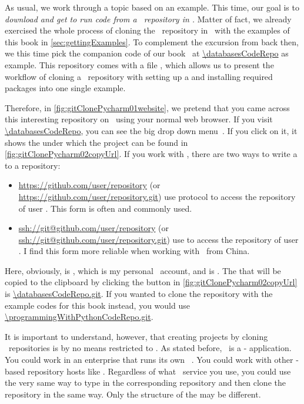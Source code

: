As usual, we work through a topic based on an example.
This time, our goal is to \emph{download and get to run code from a \github\ repository in \pycharm.}
Matter of fact, we already exercised the whole process of cloning the \github\ repository in \pycharm\ with the examples of this book in \cref{sec:gettingExamples}.
To complement the excursion from back then, we this time pick the companion code of our  book~\cite{databases} at \url{\databasesCodeRepo} as example.
This repository comes with a file , which allows us to present the workflow of cloning a \git\ repository with setting up a  and installing required packages into one single example.

Therefore, in \cref{fig:gitClonePycharm01website}, we pretend that you came across this interesting repository on \github\ using your normal web browser.
If you visit \url{\databasesCodeRepo}, you can see the big drop down menu~.
If you click on it, it shows the   under which the project can be found in \cref{fig:gitClonePycharm02copyUrl}.
If you work with \github, there are two ways to write a  to a repository:%
%
\begin{itemize}%
%
\item \url{https://github.com/user/repository} (or \url{https://github.com/user/repository.git}) use  protocol to access the repository  of user . %
This form is often and commonly used.%
%
\item \url{ssh://git@github.com/user/repository} (or \url{ssh://git@github.com/user/repository.git}) use  to access the repository  of user . %
I find this form more reliable when working with \github\ from China.%
%
\end{itemize}%
%
Here, obviously,  is , which is my personal \github\ account, and  is .
The  that will be copied to the clipboard by clicking the button in \cref{fig:gitClonePycharm02copyUrl} is \url{\databasesCodeRepo.git}.
If you wanted to clone the repository with the example codes for this book instead, you would use \url{\programmingWithPythonCodeRepo.git}.

It is important to understand, however, that creating projects by cloning \git\ repositories is by no means restricted to \github.
As stated before, \git\ is a - application.
You could work in an enterprise that runs its own \git\ .
You could work with other \git-based repository hosts like .
Regardless of what \git\ service you use, you could use the very same way to type in the corresponding repository  and then clone the repository in the same way.
Only the structure of the  may be different.

